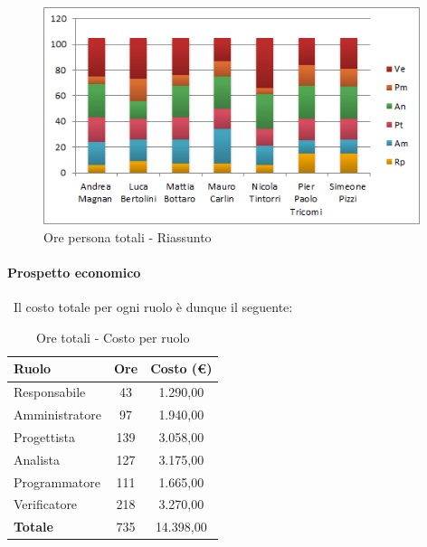 \documentclass[./PianoDiProgetto.tex]{subfiles}
\begin{document}
	\begin{figure}[H]
		\centering
		\includegraphics[width=11cm, trim=1cm 0cm 1cm 0cm]{grafici/TOT-persona}
			\caption{Ore persona totali - Riassunto}
	\end{figure}
	
\newpage	
	
	\paragraph{Prospetto economico}\
					Il costo totale per ogni ruolo è dunque il seguente:
	\begin{table}[H]
		\centering
		\begin{tabular}{l * {2}{c}}
			\toprule
			\textbf{Ruolo} & \textbf{Ore} & \textbf{Costo (\euro{})} \\
			\midrule
			Responsabile & 43    &  1.290,00 \\
			Amministratore  & 97   &  1.940,00 \\
			Progettista  & 139   &  3.058,00 \\
			Analista & 127   &  3.175,00 \\
			Programmatore  & 111   &  1.665,00 \\
			Verificatore  & 218   &  3.270,00 \\
			\midrule
			\textbf{Totale}  & 735  &  14.398,00 \\
			\bottomrule
			
		\end{tabular}
		\caption{Ore totali - Costo per ruolo}
	\end{table}

\vspace{35 mm}	
	
\end{document}
